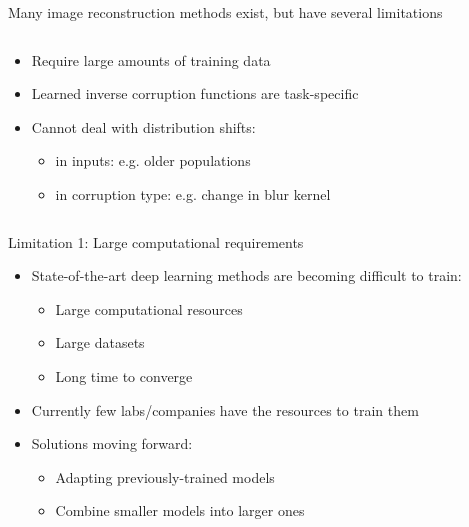 \begin{frame}{Many image reconstruction methods exist, but have several limitations}


\begin{columns}
 \begin{column}{0.5\textwidth}

 \begin{itemize}
 \item Require large amounts of training data
 
 \vt
 
 \item Learned inverse corruption functions are task-specific
 
 \vt 
 
 \item Cannot deal with distribution shifts:
 \begin{itemize}
   \item in inputs: e.g. older populations
   \item in corruption type: e.g. change in blur kernel
 \end{itemize}
 
  
 \end{itemize}

 \end{column}

 \begin{column}{0.5\textwidth}
  \centering
{}
  
 \end{column}
\end{columns} 
 

  


 
 
\end{frame}



\begin{frame}{Limitation 1: Large computational requirements}

\begin{itemize}
 \item State-of-the-art deep learning methods are becoming difficult to train:
 \begin{itemize}
 \item Large computational resources
 \item Large datasets
 \item Long time to converge
 
\end{itemize}
\vo
 \item Currently few labs/companies have the resources to train them

\vo
 \item Solutions moving forward:
 \begin{itemize}
\item Adapting previously-trained models
\item Combine smaller models into larger ones
\end{itemize}
\end{itemize}

 
\end{frame}

